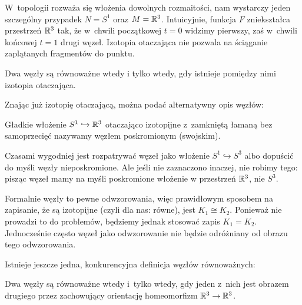 W~topologii rozważa się włożenia dowolnych rozmaitości, nam wystarczy jeden szczególny przypadek $N = S^1$ oraz $M = \mathbb R^3$.
Intuicyjnie, funkcja $F$ zniekształca przestrzeń $\mathbb R^3$ tak, że w~chwili początkowej $t = 0$ widzimy pierwszy, zaś w~chwili końcowej $t = 1$ drugi węzeł.
Izotopia otaczająca nie pozwala na ściąganie zaplątanych fragmentów do punktu.

\begin{definition}
    Dwa węzły są równoważne wtedy i tylko wtedy, gdy istnieje pomiędzy nimi izotopia otaczająca.
\end{definition}

Znając już izotopię otaczającą, można podać alternatywny opis węzłów:

\begin{definition}[węzeł]
%
\label{def:knot}%
    Gładkie włożenie $S^1 \hookrightarrow \mathbb R^3$ otaczająco izotopijne z~zamkniętą łamaną bez samoprzecięć nazywamy węzłem poskromionym (swojskim).
\end{definition}

Czasami wygodniej jest rozpatrywać węzeł jako włożenie $S^1 \hookrightarrow S^3$ albo dopuścić do myśli węzły nieposkromione.
Ale jeśli nie zaznaczono inaczej, nie robimy tego: pisząc węzeł mamy na myśli poskromione włożenie w przestrzeń $\mathbb R^3$, nie $S^3$.

Formalnie węzły to pewne odwzorowania, więc prawidłowym sposobem na zapisanie, że są izotopijne (czyli dla nas: równe), jest $K_1 \cong K_2$.
Ponieważ nie prowadzi to do problemów, będziemy jednak stosować zapis $K_1 = K_2$.
Jednocześnie często węzeł jako odwzorowanie nie będzie odróżniany od obrazu tego odwzorowania.

Istnieje jeszcze jedna, konkurencyjna definicja węzłów równoważnych:

\begin{proposition}
\label{def:equivalent_knots_2}%
    Dwa węzły są równoważne wtedy i~tylko wtedy, gdy jeden z~nich jest obrazem drugiego przez zachowujący orientację homeomorfizm $\mathbb R^3 \to \mathbb R^3$.
\end{proposition}

